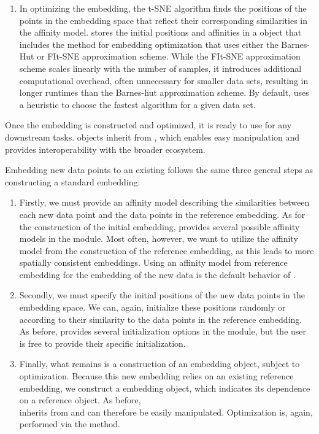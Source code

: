 \documentclass[article]{jss}
\newcommand{\opentsne}{\pkg{openTSNE}\xspace}
\begin{document}
\begin{enumerate}
\item In optimizing the embedding, the t-SNE algorithm finds the positions of the points in the embedding space that reflect their corresponding similarities in the affinity model. \opentsne stores the initial positions and affinities in a  object that includes the  method for embedding optimization that uses either the Barnes-Hut or FIt-SNE approximation scheme. While the FIt-SNE approximation scheme scales linearly with the number of samples, it introduces additional computational overhead, often unnecessary for smaller data sets, resulting in longer runtimes than the Barnes-hut approximation scheme. By default, \opentsne uses a heuristic to choose the fastest algorithm for a given data set.
\end{enumerate}

Once the embedding is constructed and optimized, it is ready to use for any downstream tasks.  objects inherit from , which enables easy manipulation and provides interoperability with the broader  ecosystem.

Embedding new data points to an existing 
follows the same three general steps as constructing a standard embedding:
\begin{enumerate}
\item Firstly, we must provide an affinity model describing the similarities between each new data point and the data points in the reference embedding. As for the construction of the initial embedding, \opentsne provides several possible affinity models in the  module. Most often, however, we want to utilize the affinity model from the construction of the reference embedding, as this leads to more spatially consistent embeddings. Using an affinity model from reference embedding for the embedding of the new data is the default behavior of \opentsne.


\item Secondly, we must specify the initial positions of the new data points in the embedding space. We can, again, initialize these positions randomly or according to their similarity to the data points in the reference embedding. As before, \opentsne provides several initialization options in the  module, but the user is free to provide their specific initialization.

\item Finally, what remains is a construction of an embedding object, subject to optimization. Because this new embedding relies on an existing reference embedding, we construct a  embedding object, which indicates its dependence on a reference  object. As before, \\
 inherits from  and can therefore be easily manipulated. Optimization is, again, performed via the  method.
\end{enumerate}
\end{document}
